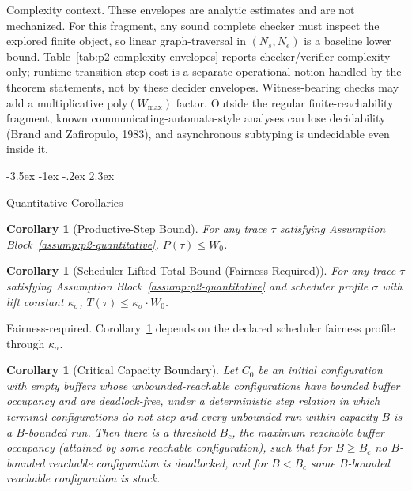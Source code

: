 \documentclass[a4paper,10pt,twocolumn,english]{article}
\makeatletter
\renewcommand{\section}{\@startsection{section}{1}{\z@}%
  {-3.5ex \@plus -1ex \@minus -.2ex}%
  {2.3ex}%
  {\raggedright\normalfont\large\bfseries}}
\numberwithin{equation}{section}
\theoremstyle{paperdef}
\theoremstyle{paperplain}
\newtheorem{corollary}[definition]{Corollary}
\theoremstyle{paperdef}
\theoremstyle{paperremark}
\newcommand{\Bc}{\ensuremath{B_c}}
\makeatother
\begin{document}
Complexity context. These envelopes are analytic estimates and are not
mechanized. For this fragment, any sound complete checker must inspect
the explored finite object, so linear graph-traversal in $(N_s,N_e)$ is a
baseline lower bound. Table~\ref{tab:p2-complexity-envelopes} reports
checker/verifier complexity only; runtime transition-step cost is a separate
operational notion handled by the theorem statements, not by these decider
envelopes. Witness-bearing checks may add a multiplicative
$\mathrm{poly}(W_{\max})$ factor.
Outside the regular finite-reachability fragment, known
communicating-automata-style analyses can lose decidability (Brand and
Zafiropulo, 1983), and asynchronous subtyping is undecidable even inside it.

\section{Quantitative Corollaries}
\label{sec:corollaries}

\begin{corollary}[Productive-Step Bound]
	\label{cor:productive}
	For any trace $\tau$ satisfying Assumption Block~\ref{assump:p2-quantitative}, $P(\tau) \le W_0$.
\end{corollary}

\begin{corollary}[Scheduler-Lifted Total Bound (Fairness-Required)]
	\label{cor:scheduler}
	For any trace $\tau$ satisfying Assumption Block~\ref{assump:p2-quantitative} and scheduler profile $\sigma$ with lift constant $\kappa_\sigma$, $T(\tau) \le \kappa_\sigma \cdot W_0$.
\end{corollary}

Fairness-required. Corollary~\ref{cor:scheduler} depends on the declared
scheduler fairness profile through $\kappa_\sigma$.

\begin{corollary}[Critical Capacity Boundary]
	\label{cor:capacity}
	Let $C_0$ be an initial configuration with empty buffers whose unbounded-reachable configurations have bounded buffer occupancy and are deadlock-free, under a deterministic step relation in which terminal configurations do not step and every unbounded run within capacity $B$ is a $B$-bounded run. Then there is a threshold $\Bc$, the maximum reachable buffer occupancy (attained by some reachable configuration), such that for $B \ge \Bc$ no $B$-bounded reachable configuration is deadlocked, and for $B < \Bc$ some $B$-bounded reachable configuration is stuck.
\end{corollary}
\end{document}
